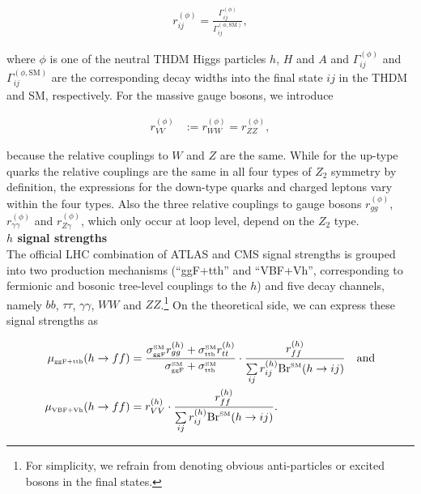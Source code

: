 \documentclass[preprint,3p,12pt]{elsarticle}
\begin{document}
{\begin{align}
 r_{ij}^{(\phi)}=\frac{\Gamma_{ij}^{(\phi)}}{\Gamma_{ij}^{(\phi,\text{SM})}}, \nonumber
\end{align}

where $\phi$ is one of the neutral THDM Higgs particles $h$, $H$ and $A$ and $\Gamma_{ij}^{(\phi)}$ and $\Gamma_{ij}^{(\phi,\text{SM})}$ are the corresponding decay widths into the final state $ij$ in the THDM and SM, respectively. For the massive gauge bosons, we introduce

\begin{align}
 r_{VV}^{(\phi)}&:=r_{WW}^{(\phi)}=r_{ZZ}^{(\phi)}, \nonumber
\end{align}

because the relative couplings to $W$ and $Z$ are the same. While for the up-type quarks the relative couplings are the same in all four types of $Z_2$ symmetry by definition, the expressions for the down-type quarks and charged leptons vary within the four types. Also the three relative couplings to gauge bosons $r_{gg}^{(\phi)}$, $r_{\gamma \gamma}^{(\phi)}$ and $r_{Z\gamma}^{(\phi)}$, which only occur at loop level, depend on the $Z_2$ type.\\

\textbf{$h$ signal strengths}\\

The official LHC combination of ATLAS and CMS signal strengths is grouped into two production mechanisms (``ggF+tth'' and ``VBF+Vh'', corresponding to fermionic and bosonic tree-level couplings to the $h$) and five decay channels, namely $bb$, $\tau \tau$, $\gamma \gamma$, $WW$ and $ZZ$.\footnote{For simplicity, we refrain from denoting obvious anti-particles or excited bosons in the final states.}
On the theoretical side, we can express these signal strengths as

\begin{align}
 \mu_{\text{\tiny{ggF+tth}}}(h\to ff) &= \frac{\sigma^{\text{\tiny{SM}}}_{\text{\tiny{ggF}}} r_{gg}^{(h)} + \sigma^{\text{\tiny{SM}}}_{\text{\tiny{tth}}} r_{tt}^{(h)}}{\sigma^{\text{\tiny{SM}}}_{\text{\tiny{ggF}}} + \sigma^{\text{\tiny{SM}}}_{\text{\tiny{tth}}}} \cdot \frac{r_{ff}^{(h)}}{\sum\limits_{ij} r_{ij}^{(h)} {\rm Br}^{\text{\tiny{SM}}} (h\to ij)} \quad \text{and}  \nonumber\\
 \mu_{\text{\tiny{VBF+Vh}}}(h\to ff) &= r_{VV}^{(h)} \cdot \frac{r_{ff}^{(h)}}{\sum\limits_{ij} r_{ij}^{(h)} {\rm Br}^{\text{\tiny{SM}}} (h\to ij)}. \nonumber
\end{align}

}
\end{document}
